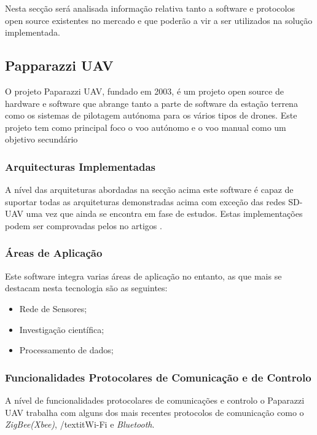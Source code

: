 Nesta secção será analisada informação relativa tanto a software e protocolos open source existentes no mercado e que poderão a vir a ser utilizados na solução implementada.

\subsection{Papparazzi UAV}

O projeto Paparazzi UAV, fundado em 2003, é um projeto open source de hardware e software que abrange tanto a parte de software da estação terrena como os sistemas de pilotagem autónoma para os vários tipos de drones. Este projeto tem como principal foco o voo autónomo e o voo manual como um objetivo secundário \cite{TheFr2003}

\subsubsection{Arquitecturas Implementadas}

A nível das arquiteturas abordadas na secção acima este software é capaz de suportar todas as arquiteturas demonstradas acima com exceção das redes SD-UAV uma vez que ainda se encontra em fase de estudos. Estas implementações podem ser comprovadas pelos no artigos \cite{Remes2013,Bouachir2014a}.

\pagebreak
\subsubsection{Áreas de Aplicação}
Este software integra varias áreas de aplicação no entanto, as que mais se destacam nesta tecnologia são as seguintes:

\begin{itemize}
    \item Rede de Sensores;
    \item Investigação científica;
    \item Processamento de dados;
\end{itemize}

\subsubsection{Funcionalidades Protocolares de Comunicação e de Controlo}

A nível de funcionalidades protocolares de comunicações e controlo o Paparazzi UAV trabalha com alguns dos mais recentes protocolos de comunicação como o \textit{ZigBee(Xbee)}, /textit{Wi-Fi} e \textit{Bluetooth}\cite{TheFr2003}.

